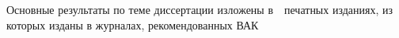 %
{\publications} Основные результаты по теме диссертации изложены в~~печатных изданиях,
 из которых изданы в журналах, рекомендованных ВАК\sloppy%
